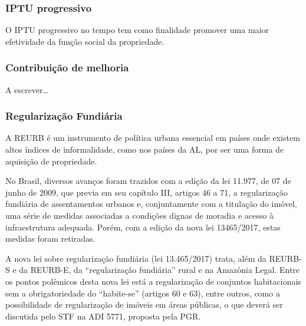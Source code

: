 \documentclass[
	12pt,				%
	oneside,			%
	a4paper,			%
	chapter=TITLE,		%
	section=TITLE,		%
	english,			%
	brazil				%
	]{abntex2}
\begin{document}
\hypertarget{iptu-progressivo}{%
\subsubsection{IPTU progressivo}\label{iptu-progressivo}}

O \gls{IPTU} progressivo no tempo tem como finalidade promover uma maior
efetividade da função social da propriedade.

\hypertarget{contribuiuxe7uxe3o-de-melhoria}{%
\subsubsection{Contribuição de melhoria}\label{contribuiuxe7uxe3o-de-melhoria}}

A escrever\ldots{}

\hypertarget{regularizauxe7uxe3o-fundiuxe1ria}{%
\subsubsection{Regularização Fundiária}\label{regularizauxe7uxe3o-fundiuxe1ria}}

A \gls{REURB} é um instrumento de política urbana essencial em países onde
existem altos índices de informalidade, como nos países da \gls{AL}, por
ser uma forma de aquisição de propriedade.

No Brasil, diversos avanços foram trazidos com a edição da lei 11.977, de 07 de
junho de 2009, que previa em seu capítulo III, artigos 46 a 71, a regularização
fundiária de assentamentos urbanos e, conjuntamente com a titulação do imóvel,
uma série de medidas associadas a condições dignas de moradia e acesso à
infraestrutura adequada. Porém, com a edição da nova lei 13465/2017, estas
medidas foram retiradas.

A nova lei sobre regularização fundiária (lei 13.465/2017) trata, além da
\gls{REURB-S} e da \gls{REURB-E}, da ``regularização fundiária'' rural e na
Amazônia Legal. Entre os pontos polêmicos desta nova lei está a regularização de
conjuntos habitacionais sem a obrigatoriedade do ``habite-se'' (artigos 60 e 63),
entre outros, como a possibilidade de regularização de imóveis em áreas
públicas, o que deverá ser discutida pelo \gls{STF} na \gls{ADI} 5771, proposta
pela \gls{PGR}.
\end{document}
